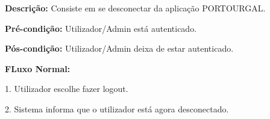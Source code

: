 \textbf{Descrição:}  Consiste em se desconectar da aplicação PORTOURGAL.

\textbf{Pré-condição:} Utilizador/Admin está autenticado.

\textbf{Pós-condição:} Utilizador/Admin deixa de estar autenticado.

\textbf{FLuxo Normal:}

1. Utilizador escolhe fazer logout.

2. Sistema informa que o utilizador está agora desconectado.